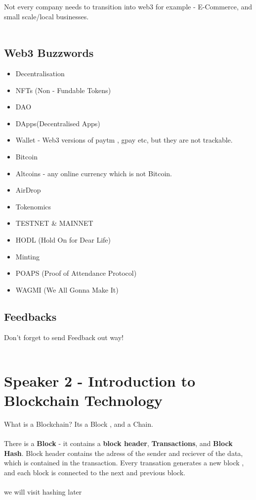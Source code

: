 \documentclass[a4paper,30pt]{report}
\begin{document}
          Not every company needs to transition into web3 for example - E-Commerce, and small scale/local businesses.\\\\
        
      \section{Web3 Buzzwords}
        \begin{itemize}
          \item Decentralisation 
          \item NFTs (Non - Fundable Tokens)
          \item DAO
          \item DApps(Decentralised Apps)
          \item Wallet - Web3 versions of paytm , gpay etc, but they are not trackable.
          \item Bitcoin
          \item Altcoins - any online currency which is not Bitcoin.
          \item AirDrop
          \item Tokenomics
          \item TESTNET \& MAINNET
          \item HODL (Hold On for Dear Life)
          \item Minting
          \item POAPS (Proof of Attendance Protocol)
          \item WAGMI (We All Gonna Make It)

        \end{itemize}
      \section{Feedbacks} Don't forget to send Feedback out way!\\\\ 
\chapter{Speaker 2 - Introduction to \textbf{Blockchain} Technology} What is a Blockchain? Its a Block , and a Chain.\\\\ 
There is a \textbf{Block} - it contains a \textbf{block header}, \textbf{Transactions}, and \textbf{Block Hash}. Block header contains the adress of the sender and reciever of the data, which is contained in the transaction. Every transation generates a new block , and each block is connected to the next and previous block.\\\\ 
we will visit hashing later\\\\ 
\end{document}
